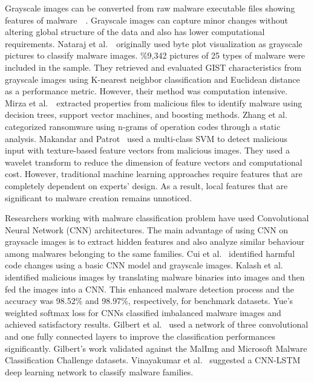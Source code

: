 \documentclass[pdflatex,sn-mathphys]{sn-jnl}%
\begin{document}
Grayscale images can be converted from raw malware executable files showing features of malware~\cite{13}~\cite{11}. Grayscale images can capture minor changes without altering global structure of the data and also has lower computational requirements. Nataraj et al.~\cite{11} originally used byte plot visualization as grayscale pictures to classify malware images. \%9,342 pictures of 25 types of malware were included in the sample.  
They retrieved and evaluated GIST characteristics from grayscale images using K-nearest neighbor classification and Euclidean distance as a performance metric. However, their method was computation intensive. Mirza et al.~\cite{15} extracted properties from malicious files to identify malware using decision trees, support vector machines, and boosting methods. Zhang et al.~\cite{16} categorized ransomware using n-grams of operation codes through a static analysis. Makandar and Patrot~\cite{38} used a multi-class SVM to detect malicious input with texture-based feature vectors from malicious images. They used a wavelet transform to reduce the dimension of feature vectors and computational cost. However, traditional machine learning approaches require features that are completely dependent on experts' design. As a result, local features that are significant to malware creation remains unnoticed. 

Researchers working with malware classification problem have used Convolutional Neural Network (CNN) architectures. The main advantage of using CNN on graysacle images is to extract hidden features and also analyze similar behaviour among malwares belonging to the same families. Cui et al.~\cite{17} identified harmful code changes using a basic CNN model and grayscale images. Kalash et al.~\cite{07} identified malicious images by translating malware binaries into images and then fed the images into a CNN. This enhanced malware detection process and the accuracy was 98.52\% and 98.97\%, respectively, for benchmark datasets. Yue's~\cite{18} weighted softmax loss for CNNs classified imbalanced malware images and achieved satisfactory results.  Gilbert et al.~\cite{19} used a  network of three convolutional and one fully connected layers to improve the classification performances significantly. Gilbert's work validated against the MalImg and Microsoft Malware Classification Challenge datasets. Vinayakumar et al.~\cite{22} suggested a CNN-LSTM deep learning network to classify malware families. 

 
\end{document}
